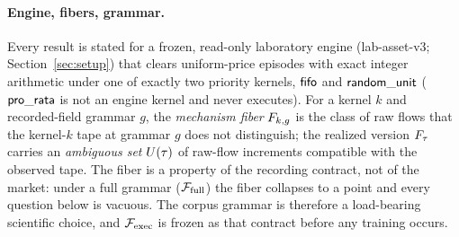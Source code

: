 \paragraph{Engine, fibers, grammar.}
Every result is stated for a frozen, read-only laboratory engine
(lab-asset-v3; Section~\ref{sec:setup}) that clears uniform-price episodes
with exact integer arithmetic under one of exactly two priority kernels,
$\mathsf{fifo}$ and $\mathsf{random\_unit}$ ($\mathsf{pro\_rata}$ is not an engine kernel and never
executes). For a kernel $k$ and recorded-field grammar $g$, the
\emph{mechanism fiber} $F_{k,g}$ is the class of raw flows that the
kernel-$k$ tape at grammar $g$ does not distinguish; the realized version
$F_{\tau}$ carries an \emph{ambiguous set} $U(\tau)$ of raw-flow increments
compatible with the observed tape. The fiber is a property of the recording
contract, not of the market: under a full grammar ($\mathcal{F}_{\mathrm{full}}$) the fiber
collapses to a point and every question below is vacuous. The corpus grammar
is therefore a load-bearing scientific choice, and $\mathcal{F}_{\mathrm{exec}}$ is frozen as
that contract before any training occurs.

